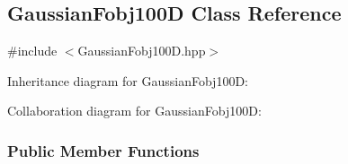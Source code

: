 \hypertarget{classGaussianFobj100D}{\subsection{\-Gaussian\-Fobj100\-D \-Class \-Reference}
\label{classGaussianFobj100D}
}


{\ttfamily \#include $<$\-Gaussian\-Fobj100\-D.\-hpp$>$}



\-Inheritance diagram for \-Gaussian\-Fobj100\-D\-:


\-Collaboration diagram for \-Gaussian\-Fobj100\-D\-:
\subsubsection*{\-Public \-Member \-Functions}
